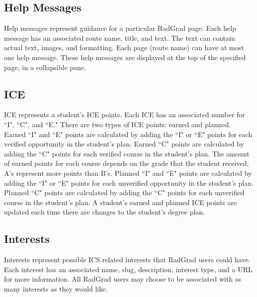 \subsection{Help Messages}
Help messages represent guidance for a particular RadGrad page. Each help message has an associated route name, title, and text. The text can contain actual text, images, and formatting. Each page (route name) can have at most one help message. These help messages are displayed at the top of the specified page, in a collapsible pane.  

\subsection{ICE}
ICE represents a student's ICE points. Each ICE has an associated number for ``I", ``C", and ``E." There are two types of ICE points: earned and planned. Earned ``I" and ``E" points are calculated by adding the ``I" or ``E" points for each verified opportunity in the student's plan. Earned ``C" points are calculated by adding the ``C" points for each verified course in the student's plan. The amount of earned points for each course depends on the grade that the student received; A's represent more points than B's. Planned ``I" and ``E" points are calculated by adding the ``I" or ``E" points for each unverified opportunity in the student's plan. Planned ``C" points are calculated by adding the ``C" points for each unverified course in the student's plan. A student's earned and planned ICE points are updated each time there are changes to the student's degree plan. 

\subsection{Interests}
Interests represent possible ICS related interests that RadGrad users could have. Each interest has an associated name, slug, description, interest type, and a URL for more information. All RadGrad users may choose to be associated with as many interests as they would like. 

